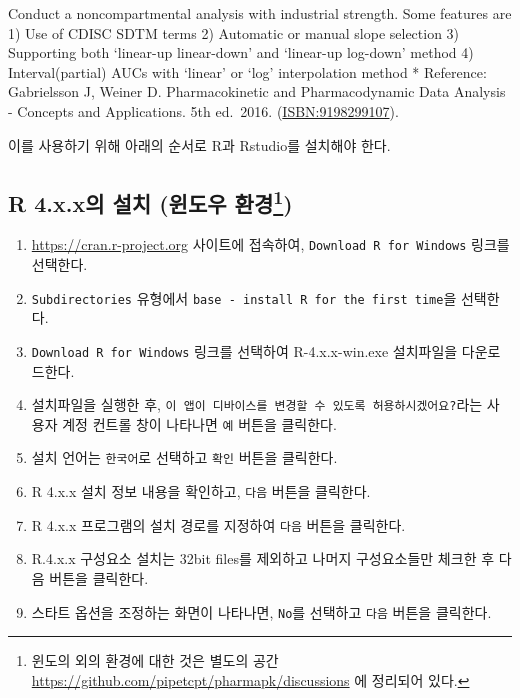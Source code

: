 \documentclass[
  11pt,
  krantz2, a4paper, twoside]{krantz}
\providecommand{\tightlist}{%
  \setlength{\itemsep}{0pt}\setlength{\parskip}{0pt}}
\renewenvironment{quote}{\begin{VF}}{\end{VF}}
\theoremstyle{definition}
\theoremstyle{definition}
\theoremstyle{definition}
\theoremstyle{definition}
\theoremstyle{remark}
\begin{document}
\begin{quote}
Conduct a noncompartmental analysis with industrial strength.
Some features are
1) Use of CDISC SDTM terms
2) Automatic or manual slope selection
3) Supporting both `linear-up linear-down' and `linear-up log-down' method
4) Interval(partial) AUCs with `linear' or `log' interpolation method
* Reference: Gabrielsson J, Weiner D. Pharmacokinetic and Pharmacodynamic Data Analysis - Concepts and Applications. 5th ed.~2016. (\url{ISBN:9198299107}).
\end{quote}

이를 사용하기 위해 아래의 순서로 R과 Rstudio를 설치해야 한다.

\hypertarget{r-4.x.xuxc758-uxc124uxce58-uxc708uxb3c4uxc6b0-uxd658uxacbd}{%
\subsection[R 4.x.x의 설치 (윈도우 환경)]{\texorpdfstring{R 4.x.x의 설치 (윈도우 환경\footnote{윈도의 외의 환경에 대한 것은 별도의 공간 \url{https://github.com/pipetcpt/pharmapk/discussions} 에 정리되어 있다.})}{R 4.x.x의 설치 (윈도우 환경)}}\label{r-4.x.xuxc758-uxc124uxce58-uxc708uxb3c4uxc6b0-uxd658uxacbd}}

\begin{enumerate}
\def\labelenumi{\arabic{enumi}.}
\tightlist
\item
  \url{https://cran.r-project.org} 사이트에 접속하여, \texttt{Download\ R\ for\ Windows} 링크를 선택한다.
\item
  \texttt{Subdirectories} 유형에서 \texttt{base\ -\ install\ R\ for\ the\ first\ time}을 선택한다.
\item
  \texttt{Download\ R\ for\ Windows} 링크를 선택하여 R-4.x.x-win.exe 설치파일을 다운로드한다.
\item
  설치파일을 실행한 후, \texttt{이\ 앱이\ 디바이스를\ 변경할\ 수\ 있도록\ 허용하시겠어요?}라는 사용자 계정 컨트롤 창이 나타나면 \texttt{예} 버튼을 클릭한다.
\item
  설치 언어는 \texttt{한국어}로 선택하고 \texttt{확인} 버튼을 클릭한다.
\item
  R 4.x.x 설치 정보 내용을 확인하고, \texttt{다음} 버튼을 클릭한다.
\item
  R 4.x.x 프로그램의 설치 경로를 지정하여 \texttt{다음} 버튼을 클릭한다.
\item
  R.4.x.x 구성요소 설치는 32bit files를 제외하고 나머지 구성요소들만 체크한 후 다음 버튼을 클릭한다.
\item
  스타트 옵션을 조정하는 화면이 나타나면, \texttt{No}를 선택하고 \texttt{다음} 버튼을 클릭한다.
\end{enumerate}
\end{document}
